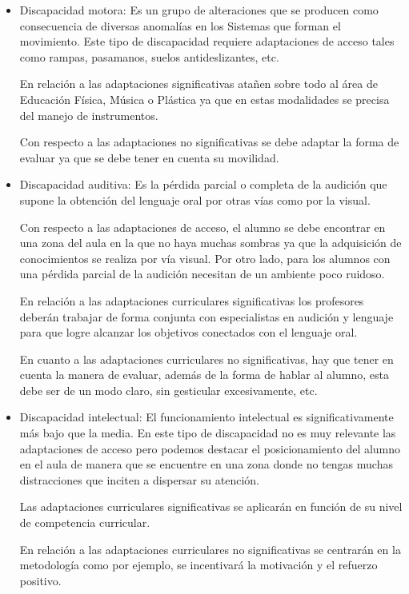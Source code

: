 \begin{itemize}
    \item Discapacidad motora: Es un grupo de alteraciones que se producen como consecuencia de diversas anomalías en los Sistemas que forman el movimiento. Este tipo de discapacidad requiere  adaptaciones de acceso tales como rampas, pasamanos, suelos antideslizantes, etc. 
    
    En relación a las adaptaciones significativas atañen sobre todo al área de Educación Física, Música o Plástica ya que en estas modalidades se precisa del manejo de instrumentos. 

    Con respecto a las adaptaciones no significativas se debe adaptar la forma de evaluar ya que se debe tener en cuenta su movilidad. 
    
    \item Discapacidad auditiva: Es la pérdida parcial o completa de la audición que supone la obtención del lenguaje oral por otras vías como por la visual. 
    
    Con respecto a las adaptaciones de acceso, el alumno se debe encontrar en una zona del aula en la que no haya muchas sombras ya que la adquisición de conocimientos se realiza por vía visual. Por otro lado, para los alumnos con una pérdida parcial de la audición necesitan de un ambiente poco ruidoso. 
    
    En relación a las adaptaciones curriculares significativas los profesores deberán trabajar de forma conjunta con especialistas en audición y lenguaje para que logre alcanzar los objetivos conectados con el lenguaje oral.

    En cuanto a las adaptaciones curriculares no significativas, hay que tener en cuenta la manera de evaluar, además de la forma de hablar al alumno, esta debe ser de un modo claro, sin gesticular excesivamente, etc.
    
    \item Discapacidad intelectual: El funcionamiento intelectual es significativamente más bajo que la media. En este tipo de discapacidad no es muy relevante las adaptaciones de acceso pero podemos destacar el posicionamiento del alumno en el aula de manera que se encuentre en una zona donde no tengas muchas distracciones  que inciten a dispersar su atención.
    
    Las adaptaciones curriculares significativas se aplicarán en función de su nivel de competencia curricular. 

    En relación a las adaptaciones curriculares no significativas se centrarán en la metodología como por ejemplo, se incentivará la motivación y el refuerzo positivo.
    

\end{itemize}
